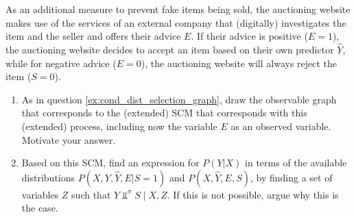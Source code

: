 As an additional measure to prevent fake items being sold, the auctioning website makes use of the services of an external company that (digitally) investigates the item and the seller and offers their advice $E$.
If their advice is positive ($E=1$), the auctioning website decides to accept an item based on their own predictor $\hat{Y}$, while for negative advice ($E=0$), the auctioning website will always reject the item ($S=0$).
\begin{enumerate}[resume*]
  \item As in question \ref{ex:cond_dist_selection_graph}, draw the observable graph that corresponds to the (extended) SCM that corresponds with this (extended) process, including now the variable $E$ as an observed variable.
    Motivate your answer.
  \item Based on this SCM, find an expression for $P(Y|X)$ in terms of the available distributions $P(X, Y, \hat{Y}, E|S=1)$ and $P(X, \hat{Y}, E, S)$,
        by finding a set of variables $Z$ such that $Y\Perp^\sigma S \mid X, Z$. 
        If this is not possible, argue why this is the case.

\end{enumerate}
